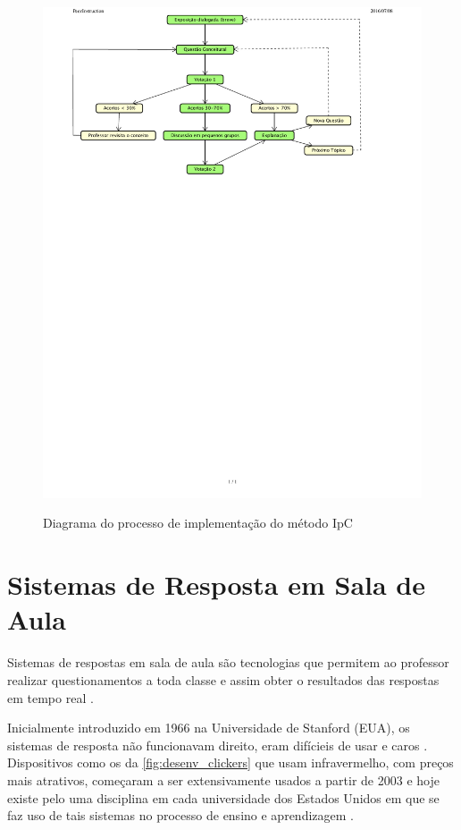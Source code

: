 \begin{figure}[htbp]
  \centering
  \caption{Diagrama do processo de implementação do método IpC}
  \includegraphics[clip, trim=0cm 18cm 3cm .4cm,scale=0.75]{imagens/peer_instruction}
  \label{fig:desen_fluxograma_ipc}
\end{figure}


\section{Sistemas de Resposta em Sala de Aula}
\label{section:sistemas_de_resposta}

Sistemas de respostas em sala de aula são tecnologias que permitem ao professor
realizar questionamentos a toda classe e assim obter o resultados das respostas
em tempo real \cite{Kay2009}.

Inicialmente introduzido em 1966 na Universidade de Stanford (EUA), os sistemas
de resposta não funcionavam direito, eram difícieis de usar e caros \cite{Kay2009}. Dispositivos
como os da \autoref{fig:desenv_clickers} que usam infravermelho, com preços mais
atrativos, começaram a ser extensivamente usados a partir de 2003 e hoje existe pelo
uma disciplina em cada universidade dos Estados Unidos em que se faz uso de tais sistemas
no processo de ensino e aprendizagem \cite{Abrahamson2014}.


